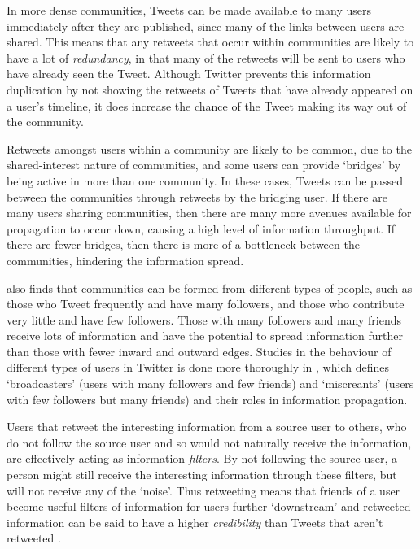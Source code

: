 In more dense communities, Tweets can be made available to many users immediately after they are published, since many of the links between users are shared. This means that any retweets that occur within communities are likely to have a lot of \textit{redundancy}, in that many of the retweets will be sent to users who have already seen the Tweet. Although Twitter prevents this information duplication by not showing the retweets of Tweets that have already appeared on a user's timeline, it does increase the chance of the Tweet making its way out of the community.

Retweets amongst users within a community are likely to be common, due to the shared-interest nature of communities, and some users can provide `bridges' by being active in more than one community. In these cases, Tweets can be passed between the communities through retweets by the bridging user. If there are many users sharing communities, then there are many more avenues available for propagation to occur down, causing a high level of information throughput. If there are fewer bridges, then there is more of a bottleneck between the communities, hindering the information spread.

\cite{java07} also finds that communities can be formed from different types of people, such as those who Tweet frequently and have many followers, and those who contribute very little and have few followers. Those with many followers and many friends receive lots of information and have the potential to spread information further than those with fewer inward and outward edges. Studies in the behaviour of different types of users in Twitter is done more thoroughly in \cite{krishnamurthy08}, which defines `broadcasters' (users with many followers and few friends) and `miscreants' (users with few followers but many friends) and their roles in information propagation.

Users that retweet the interesting information from a source user to others, who do not follow the source user and so would not naturally receive the information, are effectively acting as information \textit{filters}. By not following the source user, a person might still receive the interesting information through these filters, but will not receive any of the `noise'. Thus retweeting means that friends of a user become useful filters of information for users further `downstream'  and retweeted information can be said to have a higher \textit{credibility} than Tweets that aren't retweeted \cite{castillo11}.


